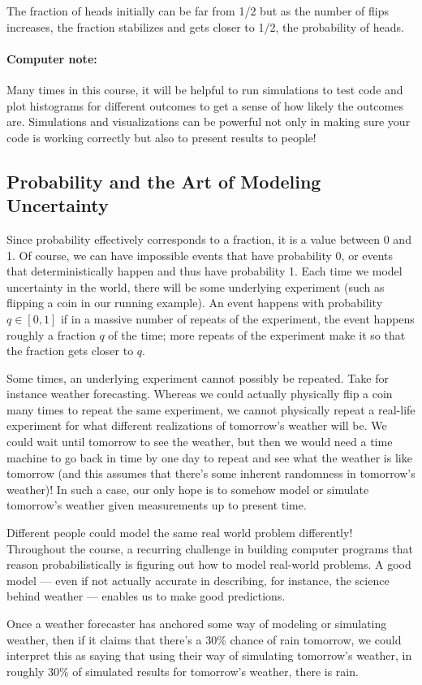 \documentclass[6008notes.tex]{subfiles}
\begin{document}
The fraction of heads initially can be far from 1/2 but as the number of flips increases, the fraction stabilizes and gets closer to 1/2, the probability of heads.

\paragraph{Computer note:} Many times in this course, it will be helpful to run simulations to test code and plot histograms for different outcomes to get a sense of how likely the outcomes are. Simulations and visualizations can be powerful not only in making sure your code is working correctly but also to present results to people!

\subsection{Probability and the Art of Modeling Uncertainty}
Since probability effectively corresponds to a fraction, it is a value between 0 and 1. Of course, we can have impossible events that have probability 0, or events that deterministically happen and thus have probability 1. Each time we model uncertainty in the world, there will be some underlying experiment (such as flipping a coin in our running example). An event happens with probability $q \in [0,1]$ if in a massive number of repeats of the experiment, the event happens roughly a fraction $q$ of the time; more repeats of the experiment make it so that the fraction gets closer to $q$.

Some times, an underlying experiment cannot possibly be repeated. Take for instance weather forecasting. Whereas we could actually physically flip a coin many times to repeat the same experiment, we cannot physically repeat a real-life experiment for what different realizations of tomorrow's weather will be. We could wait until tomorrow to see the weather, but then we would need a time machine to go back in time by one day to repeat and see what the weather is like tomorrow (and this assumes that there's some inherent randomness in tomorrow's weather)! In such a case, our only hope is to somehow model or simulate tomorrow's weather given measurements up to present time.

Different people could model the same real world problem differently! Throughout the course, a recurring challenge in building computer programs that reason probabilistically is figuring out how to model real-world problems. A good model --- even if not actually accurate in describing, for instance, the science behind weather --- enables us to make good predictions.

Once a weather forecaster has anchored some way of modeling or simulating weather, then if it claims that there's a 30\% chance of rain tomorrow, we could interpret this as saying that using their way of simulating tomorrow's weather, in roughly 30\% of simulated results for tomorrow's weather, there is rain.
\end{document}
